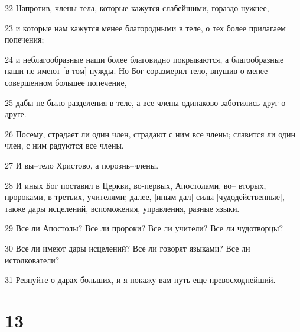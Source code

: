 \par 22 Напротив, члены тела, которые кажутся слабейшими, гораздо нужнее,
\par 23 и которые нам кажутся менее благородными в теле, о тех более прилагаем попечения;
\par 24 и неблагообразные наши более благовидно покрываются, а благообразные наши не имеют [в том] нужды. Но Бог соразмерил тело, внушив о менее совершенном большее попечение,
\par 25 дабы не было разделения в теле, а все члены одинаково заботились друг о друге.
\par 26 Посему, страдает ли один член, страдают с ним все члены; славится ли один член, с ним радуются все члены.
\par 27 И вы--тело Христово, а порознь--члены.
\par 28 И иных Бог поставил в Церкви, во-первых, Апостолами, во-- вторых, пророками, в-третьих, учителями; далее, [иным дал] силы [чудодейственные], также дары исцелений, вспоможения, управления, разные языки.
\par 29 Все ли Апостолы? Все ли пророки? Все ли учители? Все ли чудотворцы?
\par 30 Все ли имеют дары исцелений? Все ли говорят языками? Все ли истолкователи?
\par 31 Ревнуйте о дарах больших, и я покажу вам путь еще превосходнейший.

\chapter{13}

